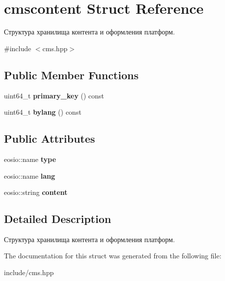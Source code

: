 \hypertarget{structcmscontent}{}\section{cmscontent Struct Reference}
\label{structcmscontent}


Структура хранилища контента и оформления платформ.  




{\ttfamily \#include $<$cms.\+hpp$>$}

\subsection*{Public Member Functions}
\begin{DoxyCompactItemize}
\item 
\mbox{\label{structcmscontent_ac36e99c6076f64079d59ac390593a3c9}} 
uint64\+\_\+t {\bfseries primary\+\_\+key} () const
\item 
\mbox{\label{structcmscontent_a97ea071f0bbbdfb0dcb997761e22b5ce}} 
uint64\+\_\+t {\bfseries bylang} () const
\end{DoxyCompactItemize}
\subsection*{Public Attributes}
\begin{DoxyCompactItemize}
\item 
\mbox{\label{structcmscontent_a728f21709bd37994b31c334cc2d91888}} 
eosio\+::name {\bfseries type}
\item 
\mbox{\label{structcmscontent_a954b44d1b345443ea24776a2cd46179d}} 
eosio\+::name {\bfseries lang}
\item 
\mbox{\label{structcmscontent_aedaaa678ac48fc729cf9de6da8a9b927}} 
eosio\+::string {\bfseries content}
\end{DoxyCompactItemize}


\subsection{Detailed Description}
Структура хранилища контента и оформления платформ. 

The documentation for this struct was generated from the following file\+:\begin{DoxyCompactItemize}
\item 
include/cms.\+hpp\end{DoxyCompactItemize}
